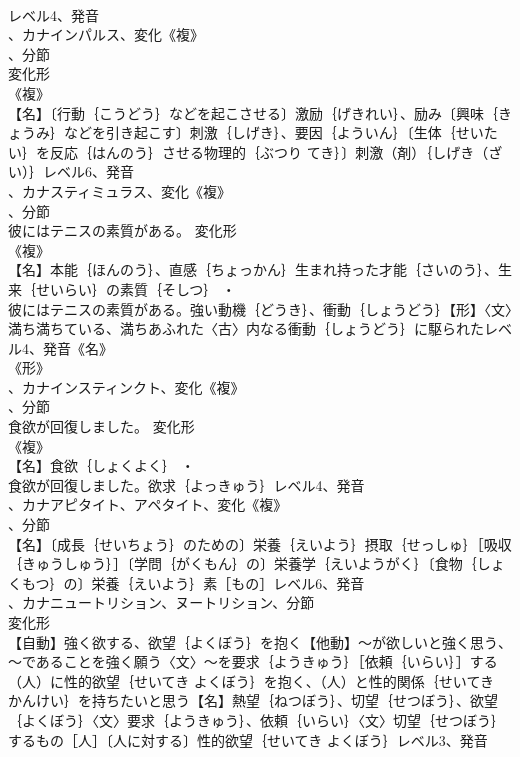 \documentclass[8pt]{extreport}
\begin{document}
\begin{CJK}{UTF8}{min}
\\	レベル4、発音
\\	、カナインパルス、変化《複》
\\	、分節
\\	変化形 
\\	《複》
\\	【名】〔行動｛こうどう｝などを起こさせる〕激励｛げきれい｝、励み〔興味｛きょうみ｝などを引き起こす〕刺激｛しげき｝、要因｛よういん｝〔生体｛せいたい｝を反応｛はんのう｝させる物理的｛ぶつり てき｝〕刺激（剤）｛しげき（ざい）｝レベル6、発音
\\	、カナスティミュラス、変化《複》
\\	、分節
\\	彼にはテニスの素質がある。	変化形 
\\	《複》
\\	【名】本能｛ほんのう｝、直感｛ちょっかん｝生まれ持った才能｛さいのう｝、生来｛せいらい｝の素質｛そしつ｝ ・
\\	彼にはテニスの素質がある。強い動機｛どうき｝、衝動｛しょうどう｝【形】〈文〉満ち満ちている、満ちあふれた〈古〉内なる衝動｛しょうどう｝に駆られたレベル4、発音《名》
\\	《形》
\\	、カナインスティンクト、変化《複》
\\	、分節
\\	食欲が回復しました。	変化形 
\\	《複》
\\	【名】食欲｛しょくよく｝ ・
\\	食欲が回復しました。欲求｛よっきゅう｝レベル4、発音
\\	、カナアピタイト、アペタイト、変化《複》
\\	、分節
\\	【名】〔成長｛せいちょう｝のための〕栄養｛えいよう｝摂取｛せっしゅ｝［吸収｛きゅうしゅう｝］〔学問｛がくもん｝の〕栄養学｛えいようがく｝〔食物｛しょくもつ｝の〕栄養｛えいよう｝素［もの］レベル6、発音
\\	、カナニュートリション、ヌートリション、分節
\\	変化形 
\\	【自動】強く欲する、欲望｛よくぼう｝を抱く【他動】～が欲しいと強く思う、～であることを強く願う〈文〉～を要求｛ようきゅう｝［依頼｛いらい｝］する（人）に性的欲望｛せいてき よくぼう｝を抱く、（人）と性的関係｛せいてき かんけい｝を持ちたいと思う【名】熱望｛ねつぼう｝、切望｛せつぼう｝、欲望｛よくぼう｝〈文〉要求｛ようきゅう｝、依頼｛いらい｝〈文〉切望｛せつぼう｝するもの［人］〔人に対する〕性的欲望｛せいてき よくぼう｝レベル3、発音

\end{CJK}
\end{document}
